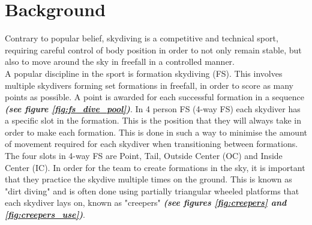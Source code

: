 \documentclass[a4paper, 12pt]{article}
\begin{document}
\section{Background}
Contrary to popular belief, skydiving is a competitive and technical sport, requiring careful control of body position in order to not only remain stable, but also to move around the sky in freefall in a controlled manner.\\
A popular discipline in the sport is formation skydiving (FS). This involves multiple skydivers forming set formations in freefall, in order to score as many points as possible. A point is awarded for each successful formation in a sequence \textbf{\emph{(see figure \ref{fig:fs_dive_pool})}}. In 4 person FS (4-way FS) each skydiver has a specific slot in the formation. This is the position that they will always take in order to make each formation. This is done in such a way to minimise the amount of movement required for each skydiver when transitioning between formations. The four slots in 4-way FS are Point, Tail, Outside Center (OC) and Inside Center (IC). 
%
In order for the team to create formations in the sky, it is important that they practice the skydive multiple times on the ground. This is known as "dirt diving" and is often done using partially triangular wheeled platforms that each skydiver lays on, known as "creepers"  \textbf{\emph{(see figures \ref{fig:creepers} and \ref{fig:creepers_use})}}.
\end{document}

